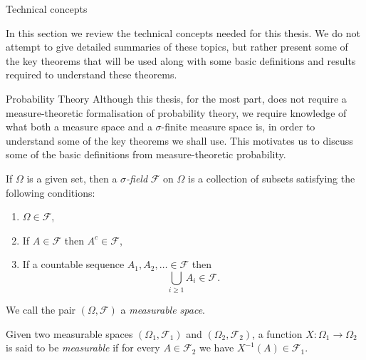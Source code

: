 \begin{section}{Technical concepts \label{sec:tc}}

In this section we review the technical concepts needed for this thesis. We do not attempt to give detailed summaries of these topics, but rather present some of the key theorems that will be used along with some basic definitions and results required to understand these theorems.

\begin{subsection}{Probability Theory}
	\label{sec:tc:pt}
	Although this thesis, for the most part, does not require a measure-theoretic formalisation of probability theory, we require knowledge of what both a measure space and a $\sigma$-finite measure space is, in order to understand some of the key theorems we shall use.
	This motivates us to discuss some of the basic definitions from measure-theoretic probability.
	\begin{definition}
		If $\Omega$ is a given set, then a \emph{$\sigma$-field} $\mathcal{F}$ on $\Omega$ is a collection of subsets satisfying the following conditions:
		\begin{enumerate}
			\item $\Omega \in \mathcal{F}$,
			\item If $A \in \mathcal{F}$ then $A^c \in \mathcal{F}$,
			\item If a countable sequence $A_1,A_2,\dots \in \mathcal{F}$ then
			\[\bigcup_{i \geq 1} A_i \in \mathcal{F}. \]
		\end{enumerate}
		We call the pair $(\Omega, \mathcal{F})$ a \emph{measurable space}.
	\end{definition}

	\begin{definition}
	Given two measurable spaces $(\Omega_1,\mathcal{F}_1)$ and $(\Omega_2,\mathcal{F}_2)$, a function $X: \Omega_1 \to \Omega_2$ is said to be \emph{measurable} if for every $A \in \mathcal{F}_2$ we have $X^{-1}(A) \in \mathcal{F}_1$.
	\end{definition}


\end{subsection}
\end{section}
